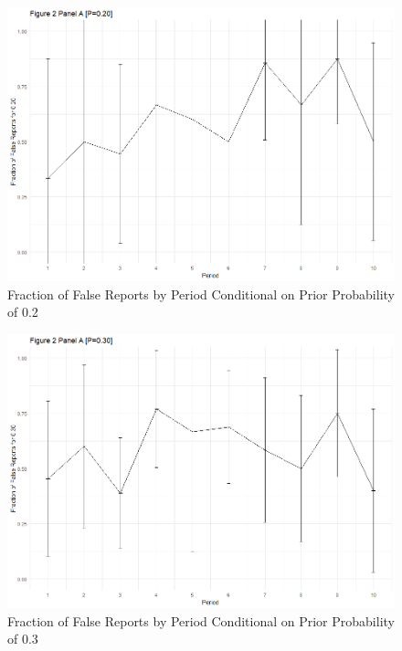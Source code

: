\documentclass[12pt,a4paper]{article}
\begin{document}
	\begin{figure}
		\centering
		\includegraphics[scale=0.4]{../../results/2a_20.png}
		\caption{Fraction of False Reports by Period Conditional on Prior Probability of 0.2} \label{tab:F2}
		\label{fig:enter-label}
	\end{figure}
	
	\begin{figure}
		\centering
		\includegraphics[scale=0.4]{../../results/2a_30.png}
		\caption{Fraction of False Reports by Period Conditional on Prior Probability of 0.3} \label{tab:F3}
		\label{fig:enter-label}
	\end{figure}
	
\end{document}
